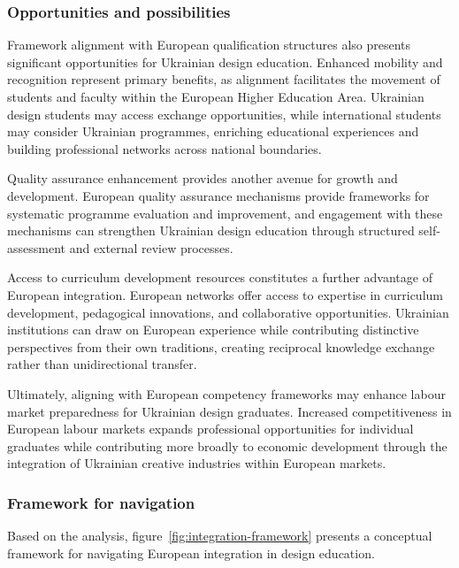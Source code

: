 \documentclass[ed]{acnsart}
\begin{document}
	\subsubsection{Opportunities and possibilities}
	
	Framework alignment with European qualification structures also presents significant opportunities for Ukrainian design education. Enhanced mobility and recognition represent primary benefits, as alignment facilitates the movement of students and faculty within the European Higher Education Area. Ukrainian design students may access exchange opportunities, while international students may consider Ukrainian programmes, enriching educational experiences and building professional networks across national boundaries.
	
	Quality assurance enhancement provides another avenue for growth and development. European quality assurance mechanisms provide frameworks for systematic programme evaluation and improvement, and engagement with these mechanisms can strengthen Ukrainian design education through structured self-assessment and external review processes.
	
	Access to curriculum development resources constitutes a further advantage of European integration. European networks offer access to expertise in curriculum development, pedagogical innovations, and collaborative opportunities. Ukrainian institutions can draw on European experience while contributing distinctive perspectives from their own traditions, creating reciprocal knowledge exchange rather than unidirectional transfer.
	
	Ultimately, aligning with European competency frameworks may enhance labour market preparedness for Ukrainian design graduates. Increased competitiveness in European labour markets expands professional opportunities for individual graduates while contributing more broadly to economic development through the integration of Ukrainian creative industries within European markets.
	
	\subsubsection{Framework for navigation}
	
	Based on the analysis, figure~\ref{fig:integration-framework} presents a conceptual framework for navigating European integration in design education.
	
\end{document}
